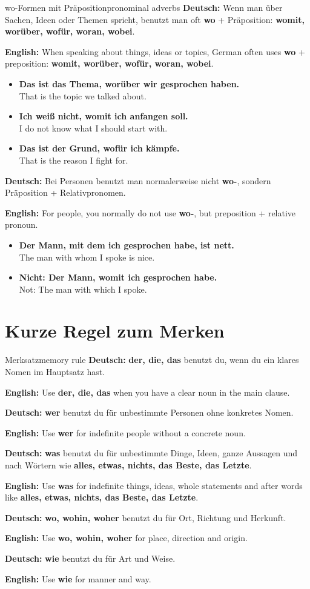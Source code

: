 \documentclass[a4paper,11pt]{article}
\newcommand{\GermanText}[1]{\textbf{Deutsch: }#1\par}
\newcommand{\EnglishText}[1]{{\small\color{SoftGray}\textbf{English: }#1\par}}
\newcommand{\ExampleItem}[2]{\item \textbf{#1}\\{\small\color{SoftGray}#2}}
\begin{document}
\begin{grammarentry}{wo-Formen mit Präposition}{pronominal adverbs}
\GermanText{Wenn man über Sachen, Ideen oder Themen spricht, benutzt man oft \textbf{wo} + Präposition: \textbf{womit, worüber, wofür, woran, wobei}.}
\EnglishText{When speaking about things, ideas or topics, German often uses \textbf{wo} + preposition: \textbf{womit, worüber, wofür, woran, wobei}.}

\begin{exbox}
\begin{itemize}
    \ExampleItem{Das ist das Thema, worüber wir gesprochen haben.}{That is the topic we talked about.}
    \ExampleItem{Ich weiß nicht, womit ich anfangen soll.}{I do not know what I should start with.}
    \ExampleItem{Das ist der Grund, wofür ich kämpfe.}{That is the reason I fight for.}
\end{itemize}
\end{exbox}

\GermanText{Bei Personen benutzt man normalerweise nicht \textbf{wo-}, sondern Präposition + Relativpronomen.}
\EnglishText{For people, you normally do not use \textbf{wo-}, but preposition + relative pronoun.}

\begin{exbox}
\begin{itemize}
    \ExampleItem{Der Mann, mit dem ich gesprochen habe, ist nett.}{The man with whom I spoke is nice.}
    \ExampleItem{Nicht: Der Mann, womit ich gesprochen habe.}{Not: The man with which I spoke.}
\end{itemize}
\end{exbox}
\end{grammarentry}

\section{Kurze Regel zum Merken}

\begin{grammarentry}{Merksatz}{memory rule}
\GermanText{\textbf{der, die, das} benutzt du, wenn du ein klares Nomen im Hauptsatz hast.}
\EnglishText{Use \textbf{der, die, das} when you have a clear noun in the main clause.}

\GermanText{\textbf{wer} benutzt du für unbestimmte Personen ohne konkretes Nomen.}
\EnglishText{Use \textbf{wer} for indefinite people without a concrete noun.}

\GermanText{\textbf{was} benutzt du für unbestimmte Dinge, Ideen, ganze Aussagen und nach Wörtern wie \textbf{alles, etwas, nichts, das Beste, das Letzte}.}
\EnglishText{Use \textbf{was} for indefinite things, ideas, whole statements and after words like \textbf{alles, etwas, nichts, das Beste, das Letzte}.}

\GermanText{\textbf{wo, wohin, woher} benutzt du für Ort, Richtung und Herkunft.}
\EnglishText{Use \textbf{wo, wohin, woher} for place, direction and origin.}

\GermanText{\textbf{wie} benutzt du für Art und Weise.}
\EnglishText{Use \textbf{wie} for manner and way.}
\end{grammarentry}
\end{document}
